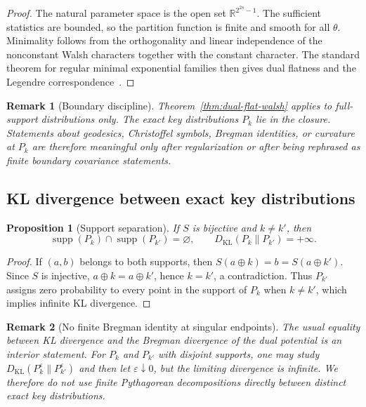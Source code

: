 \documentclass[referee,lineno,pdflatex,sn-mathphys-num]{sn-jnl}
\theoremstyle{thmstylethree}
\theoremstyle{thmstyletwo}
\newtheorem{remark}{Remark}[section]
\theoremstyle{thmstyleone}
\newtheorem{proposition}{Proposition}[section]
\newcommand{\R}{\mathbb{R}}
\newcommand{\KL}{D_{\mathrm{KL}}}
\begin{document}
\begin{proof}
The natural parameter space is the open set $\R^{2^{2s}-1}$.  The sufficient
statistics are bounded, so the partition function is finite and smooth for all
$\theta$.  Minimality follows from the orthogonality and linear independence of
the nonconstant Walsh characters together with the constant character.  The
standard theorem for regular minimal exponential families then gives dual
flatness and the Legendre correspondence~\cite{amari2000methods,ay2017information}.
\end{proof}

\begin{remark}[Boundary discipline]
Theorem~\ref{thm:dual-flat-walsh} applies to full-support distributions only.
The exact key distributions $P_k$ lie in the closure.  Statements about
geodesics, Christoffel symbols, Bregman identities, or curvature at $P_k$ are
therefore meaningful only after regularization or after being rephrased as
finite boundary covariance statements.
\end{remark}

\subsection{KL divergence between exact key distributions}\label{subsec:kl-keys}

\begin{proposition}[Support separation]\label{prop:kl-keys}
If $S$ is bijective and $k\neq k'$, then
\begin{equation}\label{eq:kl-infinite}
  \operatorname{supp}(P_k)\cap\operatorname{supp}(P_{k'})=\varnothing,
  \qquad
  \KL(P_k\|P_{k'})=+\infty.
\end{equation}
\end{proposition}

\begin{proof}
If $(a,b)$ belongs to both supports, then
$S(a\oplus k)=b=S(a\oplus k')$.  Since $S$ is injective,
$a\oplus k=a\oplus k'$, hence $k=k'$, a contradiction.  Thus $P_{k'}$ assigns
zero probability to every point in the support of $P_k$ when $k\neq k'$, which
implies infinite KL divergence.
\end{proof}

\begin{remark}[No finite Bregman identity at singular endpoints]
The usual equality between KL divergence and the Bregman divergence of the dual
potential is an interior statement.  For $P_k$ and $P_{k'}$ with disjoint
supports, one may study
$\KL(P_k^\varepsilon\|P_{k'}^\varepsilon)$ and then let
$\varepsilon\downarrow0$, but the limiting divergence is infinite.  We therefore
do not use finite Pythagorean decompositions directly between distinct exact
key distributions.
\end{remark}
\end{document}
